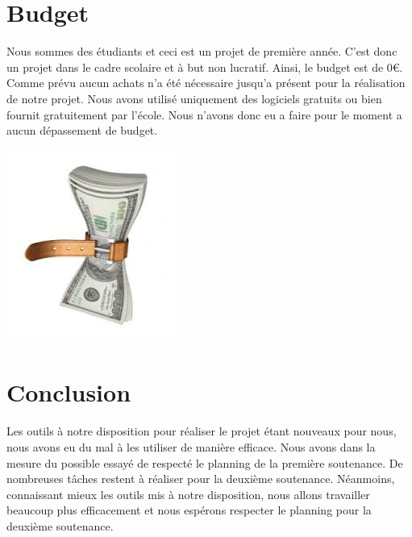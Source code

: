 \documentclass[a4paper, 12pt]{article}
\begin{document}
\section{Budget}

Nous sommes des étudiants et ceci est un projet de première année. C'est donc un projet dans le cadre scolaire et à but non lucratif. Ainsi, le budget est de 0\euro{}. Comme prévu aucun achats n'a été nécessaire jusqu'a présent pour la réalisation de notre projet. Nous avons utilisé uniquement des logiciels gratuits ou bien fournit gratuitement par l'école. Nous n'avons donc eu a faire pour le moment a aucun dépassement de budget.\\

\centerline{\includegraphics[scale=0.7]{images.jpg}}

\section{Conclusion}

Les outils à notre disposition pour réaliser le projet étant  nouveaux pour nous, nous avons eu du mal à les utiliser de manière efficace.  Nous avons dans la mesure du possible essayé de respecté le planning de la première soutenance. De nombreuses tâches restent à réaliser pour la deuxième soutenance. Néanmoins,  connaissant mieux les outils mis à notre disposition, nous allons travailler beaucoup plus efficacement et nous espérons respecter le planning pour la deuxième soutenance. 
\end{document}
